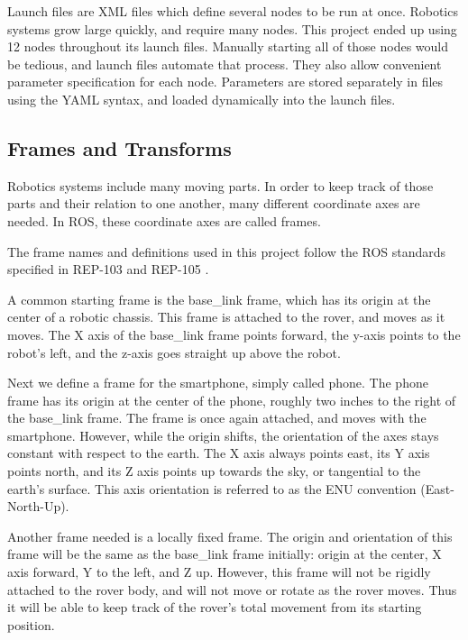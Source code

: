 Launch files are XML files which define several nodes to be run at once. Robotics systems grow large quickly, and require many nodes. This project ended up using 12 nodes throughout its launch files. Manually starting all of those nodes would be tedious, and launch files automate that process. They also allow convenient parameter specification for each node. Parameters are stored separately in files using the YAML syntax, and loaded dynamically into the launch files.

\subsection{Frames and Transforms}



Robotics systems include many moving parts. In order to keep track of those parts and their relation to one another, many different coordinate axes are needed. In ROS, these coordinate axes are called frames.


The frame names and definitions used in this project follow the ROS standards specified in REP-103 and REP-105 \cite{}.

A common starting frame is the base\_link frame, which has its origin at the center of a robotic chassis. This frame is attached to the rover, and moves as it moves. The X axis of the base\_link frame points forward, the y-axis points to the robot's left, and the z-axis goes straight up above the robot.

Next we define a frame for the smartphone, simply called phone. The phone frame has its origin at the center of the phone, roughly two inches to the right of the base\_link frame. The frame is once again attached, and moves with the smartphone. However, while the origin shifts, the orientation of the axes stays constant with respect to the earth. The X axis always points east, its Y axis points north, and its Z axis points up towards the sky, or tangential to the earth's surface. This axis orientation is referred to as the ENU convention (East-North-Up).

Another frame needed is a locally fixed frame. The origin and orientation of this frame will be the same as the base\_link frame initially: origin at the center, X axis forward, Y to the left, and Z up. However, this frame will not be rigidly attached to the rover body, and will not move or rotate as the rover moves. Thus it will be able to keep track of the rover's total movement from its starting position.

